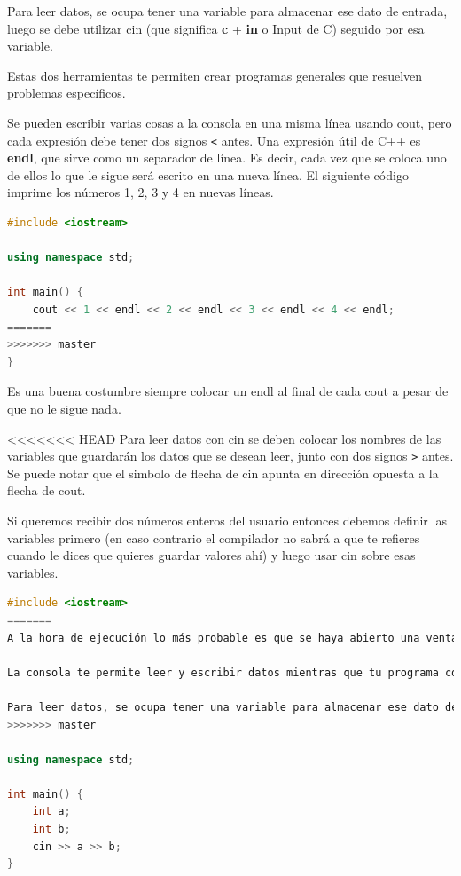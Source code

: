 \documentclass{article}
\begin{document}
Para leer datos, se ocupa tener una variable para almacenar ese dato de entrada, luego se debe utilizar cin (que significa \textbf{c} + \textbf{in} o Input de C) seguido por esa variable.

Estas dos herramientas te permiten crear programas generales que resuelven problemas específicos.

Se pueden escribir varias cosas a la consola en una misma línea usando cout, pero cada expresión debe tener dos signos \lstinline{<} antes. Una expresión útil de C++ es \textbf{endl}, que sirve como un separador de línea. Es decir, cada vez que se coloca uno de ellos lo que le sigue será escrito en una nueva línea. El siguiente código imprime los números 1, 2, 3 y 4 en nuevas líneas.

\begin{lstlisting}[language=C++, title=Uno a cuatro]
#include <iostream>

using namespace std;

int main() {
	cout << 1 << endl << 2 << endl << 3 << endl << 4 << endl;
=======
>>>>>>> master
}
\end{lstlisting}

Es una buena costumbre siempre colocar un endl al final de cada cout a pesar de que no le sigue nada.

<<<<<<< HEAD
Para leer datos con cin se deben colocar los nombres de las variables que guardarán los datos que se desean leer, junto con dos signos \lstinline{>} antes. Se puede notar que el simbolo de flecha de cin apunta en dirección opuesta a la flecha de cout.

Si queremos recibir dos números enteros del usuario entonces debemos definir las variables primero (en caso contrario el compilador no sabrá a que te refieres cuando le dices que quieres guardar valores ahí) y luego usar cin sobre esas variables.

\begin{lstlisting}[language=C++, title=Leyendo dos enteros]
#include <iostream>
=======
A la hora de ejecución lo más probable es que se haya abierto una ventana o consola que despliega el resultado deseado. Esto ocurre porque C++ corre dentro de esa consola, no dentro del IDE. La función del IDE es traducir el código a binario y mandarselo directamente la consola.

La consola te permite leer y escribir datos mientras que tu programa corre. Ya se ha visto que para escribir datos, se puede utilizar cout (que significa \textbf{c} + \textbf{out} o Output de C) seguido por la variable o la expresión que quieres "imprimir" a la consola.

Para leer datos, se ocupa tener una variable para almacenar ese dato de entrada, luego se debe utilizar cin (que significa \textbf{c} + \textbf{in} o Input de C) seguido por esa variable.
>>>>>>> master

using namespace std;

int main() {
	int a;
	int b;
	cin >> a >> b;
}
\end{lstlisting}
\end{document}

